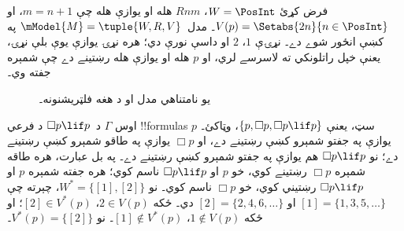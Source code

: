 \documentclass[../../../include/open-logic-section]{subfiles}
\begin{document}
\begin{ex}
  فرض کړئ $W = \PosInt$، $Rnm$ هله او يوازې هله چې $m = n + 1$،
  او $V(p) = \Setabs{2n}{n \in
    \PosInt}$۔ مدل~$\mModel{M} = \tuple{W, R, V}$ په
   کښې انځور شوے دے۔ نړۍې $1$، $2$ او
  داسې نورې دي؛ هره نړۍ يوازې يوې بلې نړۍ، يعنې خپل راتلونکي ته
  لاسرسے لري، او $p$ هله او يوازې هله رښتينے دے چې شمېره جفته وي۔

  \begin{figure}
    \centering

    \caption{يو نامتناهي مدل او د هغه فلټريشنونه۔}
  \end{figure}
  
  اوس $\Gamma$ د~$\Box p \lif p$ د فرعي !!{formula}s سټ، يعنې
  $\{p, \Box p, \Box p \lif p\}$، وټاکئ۔ $p$ يوازې په جفتو
  شمېرو کښې رښتينے دے، او $\Box p$ يوازې په طاقو شمېرو کښې
  رښتينے دے؛ نو $\Box p \lif p$ هم يوازې په جفتو شمېرو کښې
  رښتينے دے۔ په بل عبارت، هره طاقه شمېره $\Box p$ رښتينے کوي،
  خو $p$ او $\Box p \lif p$ ناسم کوي؛ هره جفته شمېره $p$ او
  $\Box p \lif p$ رښتيني کوي، خو $\Box p$ ناسم کوي۔ نو
  $W^* = \{ [1], [2] \}$، چېرته چې $[1] =
  \{1, 3, 5, \dots\}$ او $[2] = \{2, 4, 6, \dots\}$ دي۔ ځکه
  $2 \in V(p)$، $[2] \in V^*(p)$؛ او ځکه $1 \notin V(p)$،
  $[1] \notin V^*(p)$۔ نو $V^*(p) = \{[2]\}$۔


\end{ex}
\end{document}
